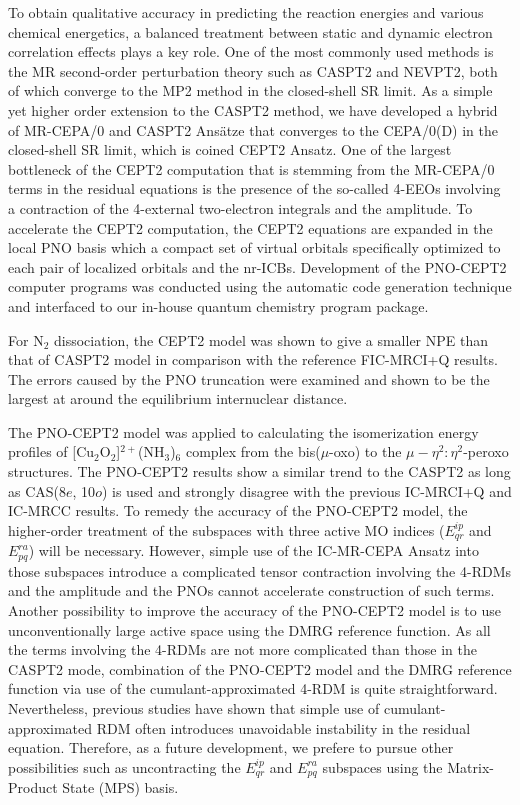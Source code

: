 \documentclass[aip,jcp,amsmath]{revtex4-1}
\begin{document}
%
To obtain qualitative accuracy in predicting the reaction energies and various chemical energetics, a balanced treatment between static and dynamic electron correlation effects plays a key role.
%
One of the most commonly used methods is the MR second-order perturbation theory such as CASPT2 and NEVPT2, both of which converge to the MP2 method in the closed-shell SR limit.
%
As a simple yet higher order extension to the CASPT2 method, we have developed a hybrid of MR-CEPA/0 and CASPT2 Ans\"atze that converges to the CEPA/0(D) in the closed-shell SR limit, which is coined CEPT2 Ansatz.
%
One of the largest bottleneck of the CEPT2 computation that is stemming from the MR-CEPA/0 terms in the residual equations is the presence of the so-called 4-EEOs involving a contraction of the 4-external two-electron integrals and the amplitude.
%
To accelerate the CEPT2 computation, the CEPT2 equations are expanded in the local PNO basis which a compact set of virtual orbitals specifically optimized to each pair of localized orbitals and the nr-ICBs.
%
Development of the PNO-CEPT2 computer programs was conducted using the automatic code generation technique and interfaced to our in-house quantum chemistry program package.

%
For N${}_2$ dissociation, the CEPT2 model was shown to give a smaller NPE than that of CASPT2 model in comparison with the reference FIC-MRCI+Q results.
%
The errors caused by the PNO truncation were examined and shown to be the largest at around the equilibrium internuclear distance.

%
The PNO-CEPT2 model was applied to calculating the isomerization energy profiles of [Cu${}_2$O${}_2$]${}^{2+}$(NH${}_3$)${}_{6}$ complex from the bis($\mu$-oxo) to the $\mu-\eta^2:\eta^2$-peroxo structures.
%
The PNO-CEPT2 results show a similar trend to the CASPT2 as long as CAS(8$e$, 10$o$) is used and strongly disagree with the previous IC-MRCI+Q and IC-MRCC results.
%
To remedy the accuracy of the PNO-CEPT2 model, the higher-order treatment of the subspaces with three active MO indices ($E^{ip}_{qr}$ and $E^{ra}_{pq}$) will be necessary.
%
However, simple use of the IC-MR-CEPA Ansatz into those subspaces introduce a complicated tensor contraction involving the 4-RDMs and the amplitude and the PNOs cannot accelerate construction of such terms.
%
Another possibility to improve the accuracy of the PNO-CEPT2 model is to use unconventionally large active space using the DMRG reference function.
%
As all the terms involving the 4-RDMs are not more complicated than those in the CASPT2 mode, combination of the PNO-CEPT2 model and the DMRG reference function via use of the cumulant-approximated 4-RDM is quite straightforward.
%
Nevertheless, previous studies have shown that simple use of cumulant-approximated RDM often introduces unavoidable instability in the residual equation.
%
Therefore, as a future development, we prefere to pursue other possibilities such as uncontracting the $E^{ip}_{qr}$ and $E^{ra}_{pq}$ subspaces using the Matrix-Product State (MPS) basis.
\end{document}
